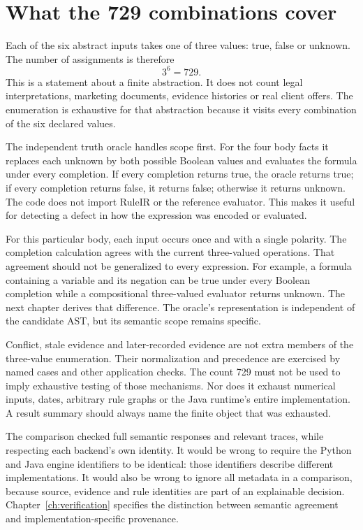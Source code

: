 \documentclass[12pt,a4paper,oneside,openany]{book}
\begin{document}
\section{What the 729 combinations cover}
\label{sec:circular-enumeration}
Each of the six abstract inputs takes one of three values: true, false or
unknown. The number of assignments is therefore
\begin{equation}
 3^6=729.
 \label{eq:case-domain-size}
\end{equation}
This is a statement about a finite abstraction. It does not count legal
interpretations, marketing documents, evidence histories or real client offers.
The enumeration is exhaustive for that abstraction because it visits every
combination of the six declared values.

The independent truth oracle handles scope first. For the four body facts it
replaces each unknown by both possible Boolean values and evaluates the formula
under every completion. If every completion returns true, the oracle returns
true; if every completion returns false, it returns false; otherwise it returns
unknown. The code does not import RuleIR or the reference evaluator. This makes
it useful for detecting a defect in how the expression was encoded or evaluated.

For this particular body, each input occurs once and with a single polarity.
The completion calculation agrees with the current three-valued operations.
That agreement should not be generalized to every expression. For example, a
formula containing a variable and its negation can be true under every Boolean
completion while a compositional three-valued evaluator returns unknown. The
next chapter derives that difference. The oracle's representation is independent
of the candidate AST, but its semantic scope remains specific.

Conflict, stale evidence and later-recorded evidence are not extra members of
the three-value enumeration. Their normalization and precedence are exercised
by named cases and other application checks. The count 729 must not be used to
imply exhaustive testing of those mechanisms. Nor does it exhaust numerical
inputs, dates, arbitrary rule graphs or the Java runtime's entire implementation.
A result summary should always name the finite object that was exhausted.

The comparison checked full semantic responses and relevant traces, while
respecting each backend's own identity. It would be wrong to require the Python
and Java engine identifiers to be identical: those identifiers describe
different implementations. It would also be wrong to ignore all metadata in a
comparison, because source, evidence and rule identities are part of an
explainable decision. Chapter~\ref{ch:verification} specifies the distinction
between semantic agreement and implementation-specific provenance.
\end{document}
